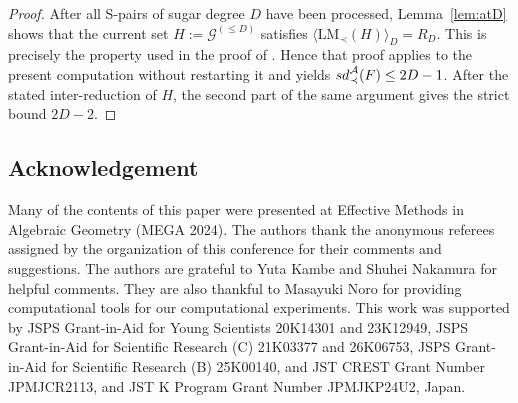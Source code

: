 \documentclass{article}
\theoremstyle{definition}
\theoremstyle{plain}
\theoremstyle{plain}
\theoremstyle{plain}
\theoremstyle{plain}
\numberwithin{equation}{subsection}
\begin{document}
\begin{proof}
After all S-pairs of sugar degree $D$ have been processed, Lemma~\ref{lem:atD} shows that the current set $H:=\mathcal G^{(\leq D)}$ satisfies $\langle\mathrm{LM}_{\prec}(H)\rangle_D=R_D$.
This is precisely the property used in the proof of \cite[Lemma~4]{KY}.
Hence that proof applies to the present computation without restarting it and yields ${\rm sd}_{\prec}^{\mathcal A}(F)\le2D-1$.
After the stated inter-reduction of $H$, the second part of the same argument gives the strict bound $2D-2$.
\end{proof}

\subsection*{Acknowledgement}
Many of the contents of this paper were presented at Effective Methods in Algebraic Geometry (MEGA 2024).
The authors thank the anonymous referees assigned by the organization of this conference for their comments and suggestions.
The authors are grateful to Yuta Kambe and Shuhei Nakamura for helpful comments. They are also thankful to Masayuki Noro for providing 
computational tools for our computational experiments. 
This work was supported by JSPS Grant-in-Aid for Young Scientists 20K14301 and 23K12949, JSPS Grant-in-Aid for Scientific Research (C) 21K03377 and 26K06753, JSPS Grant-in-Aid for Scientific Research (B) 25K00140, and JST CREST Grant Number JPMJCR2113, and JST K Program Grant Number JPMJKP24U2, Japan.
\end{document}
